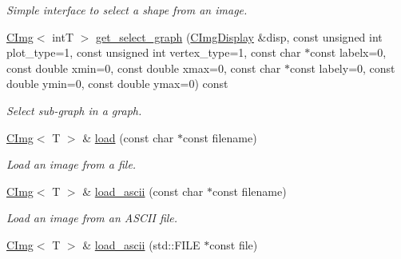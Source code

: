 \begin{DoxyCompactItemize}
\begin{DoxyCompactList}\small\item\em Simple interface to select a shape from an image. \item\end{DoxyCompactList}\item 
\hypertarget{structcimg__library_1_1CImg_a2b77e436a48fd24c423e924c2dae4072}{
\hyperlink{structcimg__library_1_1CImg}{CImg}$<$ intT $>$ \hyperlink{structcimg__library_1_1CImg_a2b77e436a48fd24c423e924c2dae4072}{get\_\-select\_\-graph} (\hyperlink{structcimg__library_1_1CImgDisplay}{CImgDisplay} \&disp, const unsigned int plot\_\-type=1, const unsigned int vertex\_\-type=1, const char $\ast$const labelx=0, const double xmin=0, const double xmax=0, const char $\ast$const labely=0, const double ymin=0, const double ymax=0) const }
\label{structcimg__library_1_1CImg_a2b77e436a48fd24c423e924c2dae4072}

\begin{DoxyCompactList}\small\item\em Select sub-\/graph in a graph. \item\end{DoxyCompactList}\item 
\hyperlink{structcimg__library_1_1CImg}{CImg}$<$ T $>$ \& \hyperlink{structcimg__library_1_1CImg_a138dcc5db93d511d224d88405a0041ce}{load} (const char $\ast$const filename)
\begin{DoxyCompactList}\small\item\em Load an image from a file. \item\end{DoxyCompactList}\item 
\hypertarget{structcimg__library_1_1CImg_a8483309e9e347b1f8b35337c543d7aed}{
\hyperlink{structcimg__library_1_1CImg}{CImg}$<$ T $>$ \& \hyperlink{structcimg__library_1_1CImg_a8483309e9e347b1f8b35337c543d7aed}{load\_\-ascii} (const char $\ast$const filename)}
\label{structcimg__library_1_1CImg_a8483309e9e347b1f8b35337c543d7aed}

\begin{DoxyCompactList}\small\item\em Load an image from an ASCII file. \item\end{DoxyCompactList}\item 
\hypertarget{structcimg__library_1_1CImg_ab6d4e031a6049d9310f6dfbd8ca88b9a}{
\hyperlink{structcimg__library_1_1CImg}{CImg}$<$ T $>$ \& \hyperlink{structcimg__library_1_1CImg_ab6d4e031a6049d9310f6dfbd8ca88b9a}{load\_\-ascii} (std::FILE $\ast$const file)}
\label{structcimg__library_1_1CImg_ab6d4e031a6049d9310f6dfbd8ca88b9a}


\end{DoxyCompactItemize}
